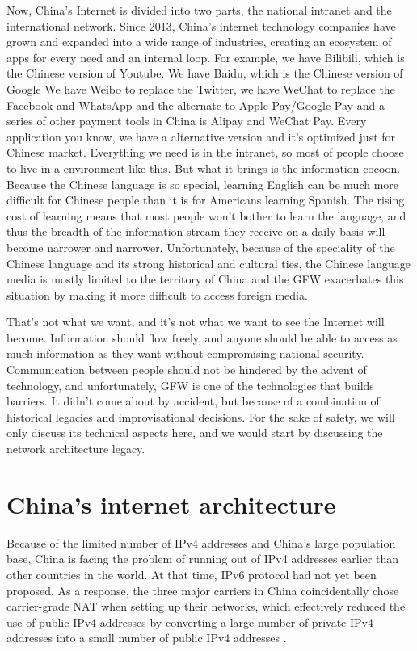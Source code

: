 \documentclass[11pt]{article}
\begin{document}
Now, China's Internet is divided into two parts, the national intranet and the
international network. Since 2013, China's internet technology companies have
grown and expanded into a wide range of industries, creating an ecosystem of
apps for every need and an internal loop. For example, we have Bilibili, which
is the Chinese version of Youtube. We have Baidu, which is the Chinese version
of Google We have Weibo to replace the Twitter, we have WeChat to replace the
Facebook and WhatsApp and the alternate to Apple Pay/Google Pay and a series of
other payment tools in China is Alipay and WeChat Pay. Every application you
know, we have a alternative version and it's optimized just for Chinese market.
Everything we need is in the intranet, so most of people choose to live in a
environment like this. But what it brings is the information cocoon. Because the
Chinese language is so special, learning English can be much more difficult for
Chinese people than it is for Americans learning Spanish. The rising cost of
learning means that most people won't bother to learn the language, and thus the
breadth of the information stream they receive on a daily basis will become
narrower and narrower. Unfortunately, because of the speciality of the Chinese
language and its strong historical and cultural ties, the Chinese language media
is mostly limited to the territory of China and the GFW exacerbates this
situation by making it more difficult to access foreign media.

That's not what we want, and it's not what we want to see the Internet will
become. Information should flow freely, and anyone should be able to access as
much information as they want without compromising national security.
Communication between people should not be hindered by the advent of technology,
and unfortunately, GFW is one of the technologies that builds barriers. It
didn't come about by accident, but because of a combination of historical
legacies and improvisational decisions. For the sake of safety, we will only
discuss its technical aspects here, and we would start by discussing the network
architecture legacy.

\section{China's internet architecture}

Because of the limited number of IPv4 addresses and China's large population
base, China is facing the problem of running out of IPv4 addresses earlier than
other countries in the world. At that time, IPv6 protocol had not yet been
proposed. As a response, the three major carriers in China coincidentally chose
carrier-grade NAT when setting up their networks, which effectively reduced the
use of public IPv4 addresses by converting a large number of private IPv4
addresses into a small number of public IPv4 addresses \cite{CISCONAT}.
\end{document}
